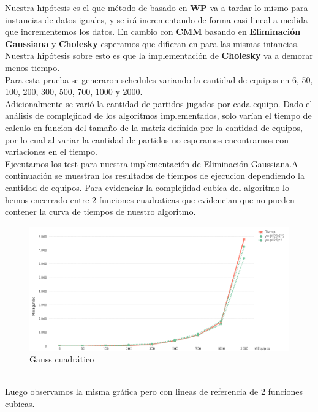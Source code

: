 Nuestra hipótesis es el que método de basado en \textbf{WP} va a tardar lo mismo para instancias de datos iguales, y se irá incrementando de forma casi lineal a medida que incrementemos los datos. En cambio con \textbf{CMM} basando en \textbf{Eliminación Gaussiana} y \textbf{Cholesky} esperamos que difieran en para las mismas intancias. Nuestra hipótesis sobre esto es que la implementación de \textbf{Cholesky} va a demorar menos tiempo. \\

Para esta prueba se generaron schedules variando la cantidad de equipos en 6, 50, 100, 200, 300, 500, 700, 1000 y 2000. \\

Adicionalmente se varió la cantidad de partidos jugados por cada equipo. Dado el análisis de complejidad de los algoritmos implementados, solo varían el tiempo de calculo en funcion del tamaño de la matriz definida por la cantidad de equipos, por lo cual al variar la cantidad de partidos no esperamos encontrarnos con variaciones en el tiempo. \\

Ejecutamos los test para nuestra implementación de Eliminación Gaussiana.A continuación se muestran los resultados de tiempos de ejecucion dependiendo la cantidad de equipos. Para evidenciar la complejidad cubica del algoritmo lo hemos encerrado entre 2 funciones cuadraticas que evidencian que no pueden contener la curva de tiempos de nuestro algoritmo. \\


\begin{figure}[H]
\centering
\includegraphics[width=1\textwidth]{IMG/gauss cuadrativo.png}
\caption{Gauss cuadrático}
\label{fig:Gauss cuadrático}
\end{figure}

\\

Luego observamos la misma gráfica pero con lineas de referencia de 2 funciones cubicas. \\


